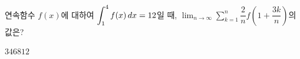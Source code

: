 \hspace*{2mm}\begin{minipage}[t]{\dimexpr\linewidth-2mm\relax}\vspace{0pt}
연속함수 $f(x)$에 대하여 $\displaystyle\int_{1}^{4}f(x)\mkern3mu dx=12$일 때, $\displaystyle\lim_{n\to\infty}\sum_{k=1}^{n}\dfrac{2}{n}f\left(1+\dfrac{3k}{n}\right)$의 값은?
\begin{choices32}{$3$}{$4$}{$6$}{$8$}{$12$}\end{choices32}\end{minipage}

